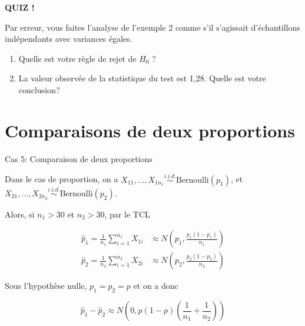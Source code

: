 \documentclass{BeamerTemplate}
\begin{document}
\begin{frame}[t]%

\centerline{\LARGE \bf \alert{QUIZ !}}
Par erreur, vous faites l'analyse de l'exemple 2 comme s'il s'agissait d'échantillons indépendants avec variances égales.
\vspace{7mm}

\begin{enumerate}\itemsep 9mm
\item Quelle est votre règle de rejet de $H_0$ ?
\item La valeur observée de la statistique du test est 1,28. Quelle est votre conclusion?
\end{enumerate}
\vspace{1.4cm}

\end{frame}


\section{Comparaisons de deux proportions}
\begin{frame}[t]{Cas 5: Comparaison de deux proportions}

Dans le cas de proportion, on a $X_{11}, \ldots, X_{1n_1} \overset{i.i.d.}{\sim} \mbox{Bernoulli}(p_1)$, et $X_{21}, \ldots, X_{2n_2} \overset{i.i.d.}{\sim} \mbox{Bernoulli}(p_2).$

\vspace{0.25cm}
Alors, si $n_1 >30$ et $n_2 > 30$, par le TCL

\begin{align*}
\hat{p}_1 = \frac{1}{n_1} \sum_{i=1}^{n_1} X_{1i} &\approx N\left(p_1, \frac{p_1(1-p_1)}{n_1} \right) \\
\hat{p}_2 = \frac{1}{n_2} \sum_{i=1}^{n_2} X_{2i} &\approx N\left(p_2, \frac{p_2(1-p_2)}{n_2}\right)
\end{align*}



Sous l'hypothèse nulle, $p_1 = p_2 = p$ et on a donc


$$ \hat{p}_1  - \hat{p}_2 \approx N\left( 0, p(1-p) \left( \frac{1}{n_1} + \frac{1}{n_2} \right) \right) $$
\end{frame}
\end{document}
